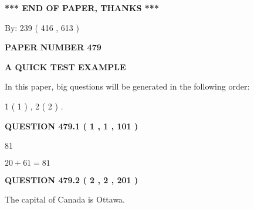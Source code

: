 \documentclass[12pt]{article}
\begin{document}
\vspace{1.0in} 
{\textbf{\large{ *** END OF PAPER, THANKS *** }}} 
   
   
\hspace{1.0in} By: 
 239 ( 416 ,  613 )
   
   
   
   
\newpage 
\setcounter{page}{ 
   479001 } 
   
   
   
   
 {\textbf{ \Large{ PAPER NUMBER  479  }}}
   
   
\vspace{0.2in}
   
   
   
   
   
   
 \vspace{0.2in}
{\LARGE {\textbf{ A QUICK TEST EXAMPLE}}}
   
   
   
\vspace{0.2in}
   
In this paper, big questions will be generated in the following order: 
   
   
   1 ( 1 )
 ,
   2 ( 2 )
 .
  
\vspace{0.2in}
  
{\textbf{\Large{QUESTION
479.1 
 ( 1 , 1 , 101 )
}}}
  
  
 
 
\noindent{}

81
 
 
 
 
\noindent{}

$ %
20 +  %
61=   %
81$
 
 
  
\vspace{0.2in}
  
{\textbf{\Large{QUESTION
479.2 
 ( 2 , 2 , 201 )
}}}
  
  
 
 
\noindent{}
 
 
The capital of Canada is Ottawa.
 
\end{document}
